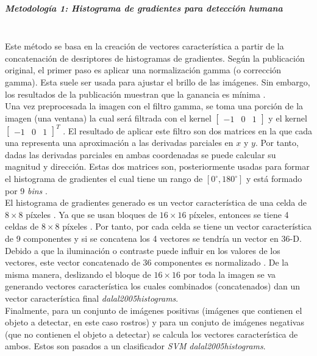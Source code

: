 \documentclass[a4paper,openright,12pt]{report}
\begin{document}
\subparagraph{Metodología 1: Histograma de gradientes para detección humana}\mbox{} \\
Este método se basa en la creación de vectores característica a partir de la
concatenación de desriptores de histogramas de gradientes. Según la publicación
original, el primer paso es aplicar una normalización gamma (o corrección
gamma). Esta suele ser usada para ajustar el brillo de las imágenes. Sin
embargo, los resultados de la publicación muestran que la ganancia es mínima
\cite{dalal2005histograms}.\\

Una vez preprocesada la imagen con el filtro gamma, se toma una porción de la
imagen (una ventana) la cual será filtrada con el kernel
$[\begin{matrix}-1 & 0 & 1\end{matrix}]$ y el kernel
$[\begin{matrix}-1 & 0 & 1\end{matrix}]^T$ \cite{dalal2005histograms}.
El resultado de aplicar este filtro son dos matrices en la que cada una
representa una aproximación a las derivadas parciales en $x$ y $y$.
Por tanto, dadas las derivadas parciales en ambas coordenadas se puede calcular
su magnitud y dirección. Estas dos matrices son, posteriormente usadas para
formar el histograma de gradientes el cual tiene un rango de
$[0^\circ, 180^\circ]$ y está formado por 9 \textit{bins}
\cite{dalal2005histograms}.\\

El histograma de gradientes generado es un vector característica de una celda
de $8 \times 8$ píxeles \cite{dalal2005histograms}. Ya que se usan bloques de
$16 \times 16$ píxeles, entonces se tiene 4 celdas de $8 \times 8$ píxeles
\cite{dalal2005histograms}. Por tanto, por cada celda se tiene un vector
característica de 9 componentes y si se concatena los 4 vectores se tendría un
vector en 36-D. Debido a que la iluminación o contraste puede influir 
en los valores de los vectores, este vector concatenado de 36 componentes es
normalizado \cite{dalal2005histograms}. De la misma manera, deslizando el
bloque de $16 \times 16$ por toda la imagen se va generando vectores
característica los cuales combinados (concatenados) dan un vector característica
final \textit{dalal2005histograms}.\\
Finalmente, para un conjunto de imágenes positivas (imágenes que contienen el
objeto a detectar, en este caso rostros) y para un conjuto de imágenes negativas
(que no contienen el objeto a detectar) se calcula los vectores característica
de ambos. Estos son pasados a un clasificador \textit{SVM}
\textit{dalal2005histograms}.
\end{document}
